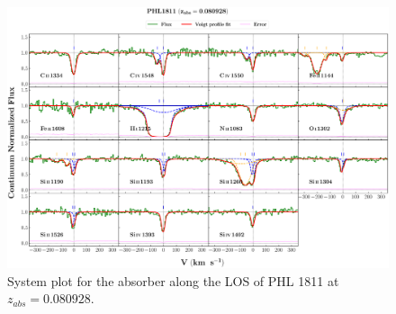   
  \newpage
  
  \begin{landscape}
  
  \begin{figure}
      \centering
      \vspace{-20mm}
      \hspace*{-35mm}
      \includegraphics[width=1.25\linewidth]{System-Plots/PHL1811_z=0.080928_sys_plot.png}
      \caption{System plot for the absorber along the LOS of PHL 1811 at $z_{abs} = 0.080928$. }
  \end{figure}
  
  \end{landscape}
  
